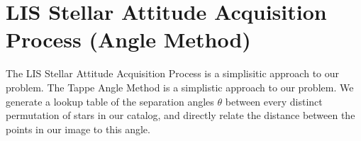 \section{LIS Stellar Attitude Acquisition Process (Angle Method)}
The LIS Stellar Attitude Acquisition Process is a simplisitic approach to our problem. 
The Tappe Angle Method is a simplistic approach to our problem. We generate a lookup table of the separation angles $\theta$ between every distinct permutation of stars in our catalog, and directly relate the distance between the points in our image to this angle. 